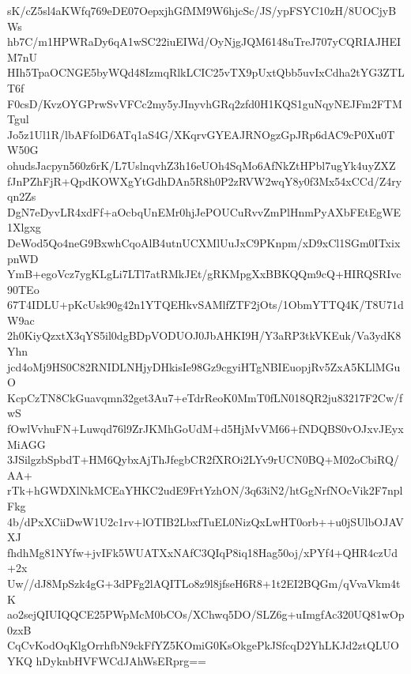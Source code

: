 sK/cZ5sl4aKWfq769eDE07OepxjhGfMM9W6hjcSc/JS/ypFSYC10zH/8UOCjyBWs
hb7C/m1HPWRaDy6qA1wSC22iuEIWd/OyNjgJQM6148uTreJ707yCQRIAJHEIM7nU
HIh5TpaOCNGE5byWQd48IzmqRlkLCIC25vTX9pUxtQbb5uvIxCdha2tYG3ZTLT6f
F0csD/KvzOYGPrwSvVFCc2my5yJInyvhGRq2zfd0H1KQS1guNqyNEJFm2FTMTgul
Jo5z1Ul1R/lbAFfolD6ATq1aS4G/XKqrvGYEAJRNOgzGpJRp6dAC9cP0Xu0TW50G
ohudsJacpyn560z6rK/L7UslnqvhZ3h16eUOh4SqMo6AfNkZtHPbl7ugYk4uyZXZ
fJnPZhFjR+QpdKOWXgYtGdhDAn5R8h0P2zRVW2wqY8y0f3Mx54xCCd/Z4ryqn2Zs
DgN7eDyvLR4xdFf+aOcbqUnEMr0hjJePOUCuRvvZmPlHnmPyAXbFEtEgWE1Xlgxg
DeWod5Qo4neG9BxwhCqoAlB4utnUCXMlUuJxC9PKnpm/xD9xCl1SGm0ITxixpnWD
YmB+egoVcz7ygKLgLi7LTl7atRMkJEt/gRKMpgXxBBKQQm9cQ+HIRQSRIvc90TEo
67T4IDLU+pKcUsk90g42n1YTQEHkvSAMlfZTF2jOts/1ObmYTTQ4K/T8U71dW9ac
2h0KiyQzxtX3qYS5il0dgBDpVODUOJ0JbAHKI9H/Y3aRP3tkVKEuk/Va3ydK8Yhn
jcd4oMj9HS0C82RNIDLNHjyDHkisIe98Gz9cgyiHTgNBIEuopjRv5ZxA5KLlMGuO
KcpCzTN8CkGuavqmn32get3Au7+eTdrReoK0MmT0fLN018QR2ju83217F2Cw/fwS
fOwlVvhuFN+Luwqd76l9ZrJKMhGoUdM+d5HjMvVM66+fNDQBS0vOJxvJEyxMiAGG
3JSilgzbSpbdT+HM6QybxAjThJfegbCR2fXROi2LYv9rUCN0BQ+M02oCbiRQ/AA+
rTk+hGWDXlNkMCEaYHKC2udE9FrtYzhON/3q63iN2/htGgNrfNOcVik2F7nplFkg
4b/dPxXCiiDwW1U2c1rv+lOTIB2LbxfTuEL0NizQxLwHT0orb++u0jSUlbOJAVXJ
fhdhMg81NYfw+jvIFk5WUATXxNAfC3QIqP8iq18Hag50oj/xPYf4+QHR4czUd+2x
Uw//dJ8MpSzk4gG+3dPFg2lAQITLo8z9l8jfseH6R8+1t2EI2BQGm/qVvaVkm4tK
ao2sejQIUIQQCE25PWpMcM0bCOs/XChwq5DO/SLZ6g+uImgfAc320UQ81wOp0zxB
CqCvKodOqKlgOrrhfbN9ckFfYZ5KOmiG0KsOkgePkJSfcqD2YhLKJd2ztQLUOYKQ
hDyknbHVFWCdJAhWsERprg==
